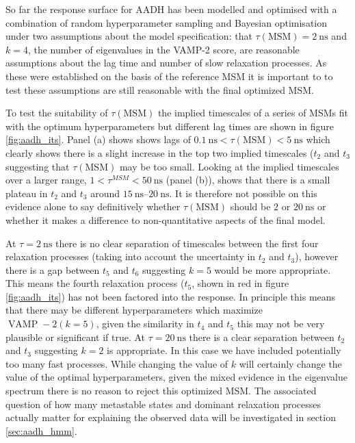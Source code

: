 So far the response surface for AADH has been modelled and optimised with a combination of random hyperparameter sampling and Bayesian optimisation under two assumptions about the model specification: that $\tau(\mathrm{MSM}) = \SI{2}{\nano\second}$ and $k=4$, the number of eigenvalues in the VAMP-2 score, are reasonable assumptions about the lag time and number of slow relaxation processes. As these were established on the basis of the reference MSM it is important to to test these assumptions are still reasonable with the final optimized MSM. 

To test the suitability of $\tau(\mathrm{MSM})$ the implied timescales of a series of MSMs fit with the optimum hyperparameters but different lag times are shown in figure \ref{fig:aadh_its}. Panel (a) shows shows lags of  $\SI{0.1}{\nano\second} < \tau(\mathrm{MSM}) < \SI{5}{\nano\second}$ which clearly shows there is a slight increase in the top two implied timescales ($t_{2}$ and $t_{3}$ suggesting that $\tau(\mathrm{MSM})$ may be too small. Looking at the implied timescales over a larger range, $1 < \tau^{MSM} < \SI{50}{\nano\second}$ (panel (b)), shows that there is a small plateau in $t_{2}$ and $t_{3}$  around  $\SIrange{15}{20}{\nano\second}$. It is therefore not possible on this evidence alone to say definitively whether $\tau(\mathrm{MSM})$ should be $2$ or $\SI{20}{\nano\second}$ or whether it makes a difference to non-quantitative aspects of the final model.  

At $\tau = \SI{2}{\nano\second}$ there is no clear separation of timescales between the first four relaxation processes (taking into account the uncertainty in $t_{2}$ and $t_{3}$), however there is a gap between $t_{5}$ and $t_{6}$ suggesting $k=5$ would be more appropriate. This means the fourth relaxation process ($t_{5}$, shown in red in figure \ref{fig:aadh_its}) has not been factored into the response. In principle this means that there may be different hyperparameters which maximize $\operatorname{VAMP}-2(k=5)$,  given the similarity in $t_{4}$ and $t_{5}$ this may not be very plausible or significant if true. At $\tau = \SI{20}{\nano\second}$ there is a clear separation between $t_{2}$ and $t_{3}$ suggesting $k=2$ is appropriate. In this case we have included potentially too many fast processes. While changing the value of $k$ will certainly change the value of the optimal hyperparameters, given the mixed evidence in the eigenvalue spectrum there is no reason to reject this optimized MSM. The associated question of how many metastable states and dominant relaxation processes actually matter for explaining the observed data will be investigated in section \ref{sec:aadh_hmm}. 

